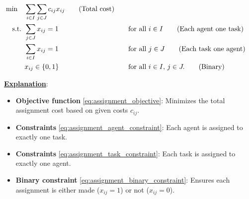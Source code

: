 \begin{align*}
\min \quad & \sum_{i \in I} \sum_{j \in J} c_{ij} x_{ij}   \tag{Total cost}\label{eq:assignment_objective} \\
\mbox{ s.t. }        & \sum_{j \in J} x_{ij} = 1 &&\quad \mbox{for all } i \in I   \tag{Each agent one task}\label{eq:assignment_agent_constraint} \\
             & \sum_{i \in I} x_{ij} = 1 &&\quad \mbox{for all } j \in J   \tag{Each task one agent}\label{eq:assignment_task_constraint} \\
             & x_{ij} \in \{0,1\} &&\quad \mbox{for all } i \in I,\, j \in J.   \tag{Binary}\label{eq:assignment_binary_constraint}
\end{align*}

\medskip
\underline{\textbf{Explanation}}:
\begin{itemize}
    \item \textbf{Objective function} \eqref{eq:assignment_objective}: Minimizes the total assignment cost based on given costs \( c_{ij} \).
    \item \textbf{Constraints} \eqref{eq:assignment_agent_constraint}: Each agent is assigned to exactly one task.
    \item \textbf{Constraints} \eqref{eq:assignment_task_constraint}: Each task is assigned to exactly one agent.
    \item \textbf{Binary constraint} \eqref{eq:assignment_binary_constraint}: Ensures each assignment is either made (\( x_{ij} = 1 \)) or not (\( x_{ij} = 0 \)).
\end{itemize}


%

